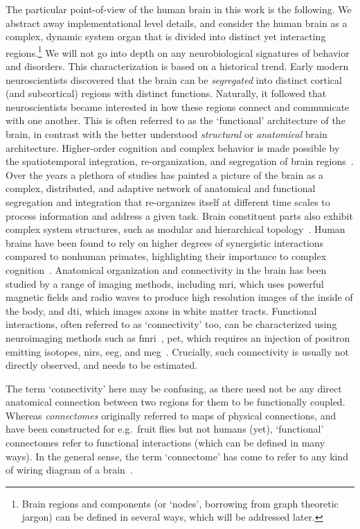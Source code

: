 The particular point-of-view of the human brain in this work is the following.
We abstract away implementational level details, and consider the human brain as a complex, dynamic system organ that is divided into distinct yet interacting regions.\footnote{Brain regions and components (or `nodes', borrowing from graph theoretic jargon) can be defined in several ways, which will be addressed later.}
We will not go into depth on any neurobiological signatures of behavior and disorders.
%
This characterization is based on a historical trend.
Early modern neuroscientists discovered that the brain can be \emph{segregated} into distinct cortical (and subcortical) regions with distinct functions.
Naturally, it followed that neuroscientists became interested in how these regions connect and communicate with one another.
This is often referred to as the `functional' architecture of the brain, in contrast with the better understood \emph{structural} or \emph{anatomical} brain architecture.
Higher-order cognition and complex behavior is made possible by the spatiotemporal integration, re-organization, and segregation of brain regions~\parencite{Deco2011}.
Over the years a plethora of studies has painted a picture of the brain as a complex, distributed, and adaptive network of anatomical and functional segregation and integration that re-organizes itself at different time scales to process information and address a given task.
Brain constituent parts also exhibit complex system structures, such as modular and hierarchical topology~\parencite{Meunier2009, Deco2015}.
Human brains have been found to rely on higher degrees of synergistic interactions compared to nonhuman primates, highlighting their importance to complex cognition~\parencite{Luppi2022}.
%
Anatomical organization and connectivity in the brain has been studied by a range of imaging methods, including \gls{mri}, which uses powerful magnetic fields and radio waves to produce high resolution images of the inside of the body, and \gls{dti}, which images axons in white matter tracts.
Functional interactions, often referred to as `connectivity' too, can be characterized using neuroimaging methods such as \gls{fmri}~\parencite{Soares2016}, \gls{pet}, which requires an injection of positron emitting isotopes, \gls{nirs}, \gls{eeg}, and \gls{meg}~\parencite{Rossini2019}.
Crucially, such connectivity is usually not directly observed, and needs to be estimated.

The term `connectivity' here may be confusing, as there need not be any direct anatomical connection between two regions for them to be functionally coupled.
Whereas \emph{connectomes} originally referred to maps of physical connections, and have been constructed for e.g.~fruit flies but not humans (yet), `functional' connectomes refer to functional interactions (which can be defined in many ways).
In the general sense, the term `connectome' has come to refer to any kind of wiring diagram of a brain~\parencite{Sporns2005}.


